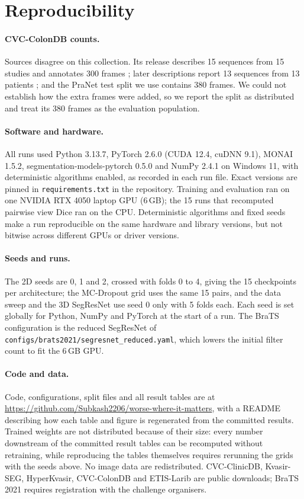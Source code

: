 \section{Reproducibility}
\label{app:repro}

\paragraph{CVC-ColonDB counts.} Sources disagree on this collection. Its release describes 15 sequences from 15 studies and annotates 300 frames \cite{bernal2012colondb}; later descriptions report 13 sequences from 13 patients \cite{vazquez2017endoscene,tudela2024benchmark}; and the PraNet test split we use contains 380 frames. We could not establish how the extra frames were added, so we report the split as distributed and treat its 380 frames as the evaluation population.
\paragraph{Software and hardware.} All runs used Python 3.13.7, PyTorch 2.6.0 (CUDA 12.4, cuDNN 9.1), MONAI 1.5.2, segmentation-models-pytorch 0.5.0 and NumPy 2.4.1 on Windows 11, with deterministic algorithms enabled, as recorded in each run file. Exact versions are pinned in \texttt{requirements.txt} in the repository. Training and evaluation ran on one NVIDIA RTX 4050 laptop GPU (6\,GB); the 15 runs that recomputed pairwise view Dice ran on the CPU. Deterministic algorithms and fixed seeds make a run reproducible on the same hardware and library versions, but not bitwise across different GPUs or driver versions.

\paragraph{Seeds and runs.} The 2D seeds are 0, 1 and 2, crossed with folds 0 to 4, giving the 15 checkpoints per architecture; the MC-Dropout grid uses the same 15 pairs, and the data sweep and the 3D SegResNet use seed 0 only with 5 folds each. Each seed is set globally for Python, NumPy and PyTorch at the start of a run. The BraTS configuration is the reduced SegResNet of \texttt{configs/brats2021/segresnet\_reduced.yaml}, which lowers the initial filter count to fit the 6\,GB GPU.

\paragraph{Code and data.} Code, configurations, split files and all result tables are at \url{https://github.com/Subkash2206/worse-where-it-matters}, with a README describing how each table and figure is regenerated from the committed results. Trained weights are not distributed because of their size: every number downstream of the committed result tables can be recomputed without retraining, while reproducing the tables themselves requires rerunning the grids with the seeds above. No image data are redistributed. CVC-ClinicDB, Kvasir-SEG, HyperKvasir, CVC-ColonDB and ETIS-Larib are public downloads; BraTS 2021 requires registration with the challenge organisers.
